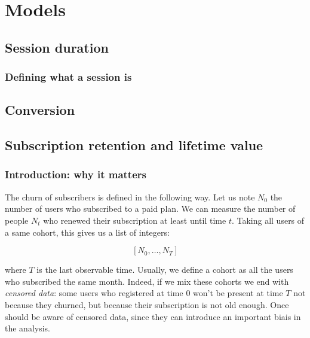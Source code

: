 \documentclass{tufte-book}
\begin{document}
\chapter{Models}
\label{chap:models}
  
  \section{Session duration}
  \label{sec:session_duration}

  \subsection{Defining what a session is}%
  \label{sec:defining_what_a_session_is}
  
  \section{Conversion}%
  \label{sec:defining_what_a_session_is}
  
  \section{Subscription retention and lifetime value}%
  \label{sec:churn_of_subscription_and_lifetime_value}


    \subsection{Introduction: why it matters}%
    \label{sub:introduction_why_it_matters}
  
  
The churn of subscribers is defined in the following way. Let us note $N_0$ the number of users who subscribed
to a paid plan. We can measure the number of people $N_t$ who renewed their subscription at least until time
$t$. Taking all users of a same cohort, this gives us a list of integers:

\begin{equation}
  \left[N_0, \dots, N_T \right]
\end{equation}

where $T$ is the last observable time. Usually, we define a cohort as all the users who subscribed the same
month. Indeed, if we mix these cohorts we end with \textit{censored data}: some users who registered at time $0$
won't be present at time $T$ not because they churned, but because their subscription is not old enough. Once
should be aware of censored data, since they can introduce an important biais in the analysis.
\end{document}
